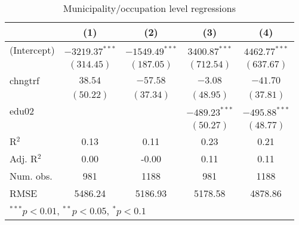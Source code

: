 
\begin{table}
\caption{Municipality/occupation level regressions}
\begin{center}
\begin{tabular}{l c c c c }
\hline
 & (1) & (2) & (3) & (4) \\
\hline
(Intercept) & $-3219.37^{***}$ & $-1549.49^{***}$ & $3400.87^{***}$ & $4462.77^{***}$ \\
            & $(314.45)$       & $(187.05)$       & $(712.54)$      & $(637.67)$      \\
chngtrf     & $38.54$          & $-57.58$         & $-3.08$         & $-41.70$        \\
            & $(50.22)$        & $(37.34)$        & $(48.95)$       & $(37.81)$       \\
edu02       &                  &                  & $-489.23^{***}$ & $-495.88^{***}$ \\
            &                  &                  & $(50.27)$       & $(48.77)$       \\
\hline
R$^2$       & 0.13             & 0.11             & 0.23            & 0.21            \\
Adj. R$^2$  & 0.00             & -0.00            & 0.11            & 0.11            \\
Num. obs.   & 981              & 1188             & 981             & 1188            \\
RMSE        & 5486.24          & 5186.93          & 5178.58         & 4878.86         \\
\hline
\multicolumn{5}{l}{\scriptsize{$^{***}p<0.01$, $^{**}p<0.05$, $^*p<0.1$}}
\end{tabular}
\label{table:coefficients}
\end{center}
\end{table}
